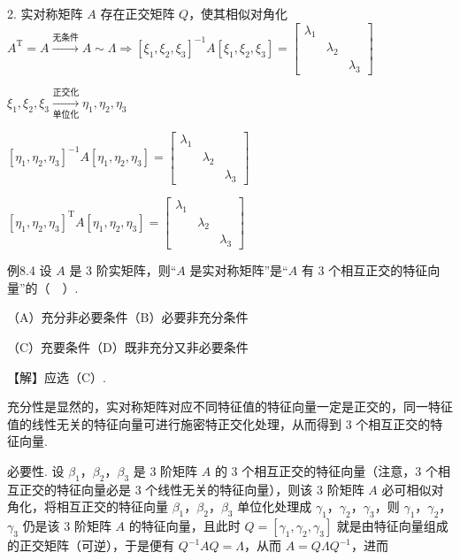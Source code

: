 \begin{fcard}{2. 实对称矩阵 $A$ 存在正交矩阵 $Q$，使其相似对角化}
$A^{\mathrm{T}}=A\xrightarrow{\text{无条件}}A\sim\Lambda\Rightarrow[\xi_1,\xi_2,\xi_3]^{-1}A[\xi_1,\xi_2,\xi_3]=\begin{bmatrix}\lambda_1&&\\&\lambda_2&\\&&\lambda_3\end{bmatrix}$

$\xi_1,\xi_2,\xi_3\xrightarrow[\text{单位化}]{\text{正交化}}\eta_1,\eta_2,\eta_3$

$[\eta_1,\eta_2,\eta_3]^{-1}A[\eta_1,\eta_2,\eta_3]=\begin{bmatrix}\lambda_1&&\\&\lambda_2&\\&&\lambda_3\end{bmatrix}$

$[\eta_1,\eta_2,\eta_3]^{\mathrm{T}}A[\eta_1,\eta_2,\eta_3]=\begin{bmatrix}\lambda_1&&\\&\lambda_2&\\&&\lambda_3\end{bmatrix}$
\end{fcard}

\begin{fcard}{例8.4}
设 $A$ 是 3 阶实矩阵，则“$A$ 是实对称矩阵”是“$A$ 有 3 个相互正交的特征向量”的（$\quad$）.

（A）充分非必要条件\qquad（B）必要非充分条件

（C）充要条件\qquad（D）既非充分又非必要条件

【解】应选（C）.

充分性是显然的，实对称矩阵对应不同特征值的特征向量一定是正交的，同一特征值的线性无关的特征向量可进行施密特正交化处理，从而得到 3 个相互正交的特征向量.
\end{fcard}


必要性. 设 $\beta_1$，$\beta_2$，$\beta_3$ 是 3 阶矩阵 $A$ 的 3 个相互正交的特征向量（注意，3 个相互正交的特征向量必是 3 个线性无关的特征向量），则该 3 阶矩阵 $A$ 必可相似对角化，将相互正交的特征向量 $\beta_1$，$\beta_2$，$\beta_3$ 单位化处理成 $\gamma_1$，$\gamma_2$，$\gamma_3$，则 $\gamma_1$，$\gamma_2$，$\gamma_3$ 仍是该 3 阶矩阵 $A$ 的特征向量，且此时 $Q=[\gamma_1,\gamma_2,\gamma_3]$ 就是由特征向量组成的正交矩阵（可逆），于是便有 $Q^{-1}AQ=\Lambda$，从而 $A=Q\Lambda Q^{-1}$，进而


